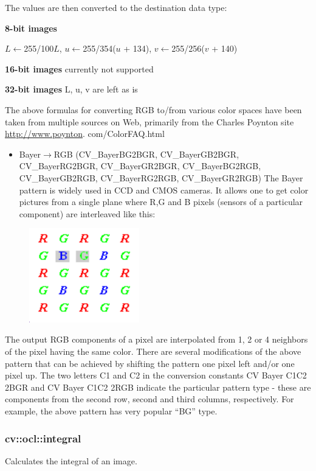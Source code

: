 \documentclass{article}
\begin{document}
The values are then converted to the destination data type:

\textbf{8-bit images}

$L\leftarrow $255/100$L$, $u\leftarrow $255/354($u$ + 134), $v\leftarrow
$255/256($v$ + 140)

\textbf{16-bit images }currently not supported

\textbf{32-bit images }L, u, v are left as is

The above formulas for converting RGB to/from various color spaces have been
taken from multiple sources on Web, primarily from the Charles Poynton site
\underline {http://www.poynton}. com/ColorFAQ.html

\begin{itemize}
\item Bayer$\to $RGB (CV{\_}BayerBG2BGR, CV{\_}BayerGB2BGR, CV{\_}BayerRG2BGR, CV{\_}BayerGR2BGR, CV{\_}BayerBG2RGB, CV{\_}BayerGB2RGB, CV{\_}BayerRG2RGB, CV{\_}BayerGR2RGB) The Bayer pattern is widely used in CCD and CMOS cameras. It allows one to get color pictures from a single plane where R,G and B pixels (sensors of a particular component) are interleaved like this:
\end{itemize}
\begin{figure}[htbp]
\centerline{\includegraphics[width=1.89in,height=1.61in]{User1.pdf}}
\label{fig1}
\end{figure}

The output RGB components of a pixel are interpolated from 1, 2 or 4
neighbors of the pixel having the same color. There are several
modifications of the above pattern that can be achieved by shifting the
pattern one pixel left and/or one pixel up. The two letters C1 and C2 in the
conversion constants CV Bayer C1C2 2BGR and CV Bayer C1C2 2RGB indicate the
particular pattern type - these are components from the second row, second
and third columns, respectively. For example, the above pattern has very
popular ``BG'' type.

\newpage

\subsubsection{cv::ocl::integral}
\label{subsubsec:mylabel49}
Calculates the integral of an image.
\end{document}
